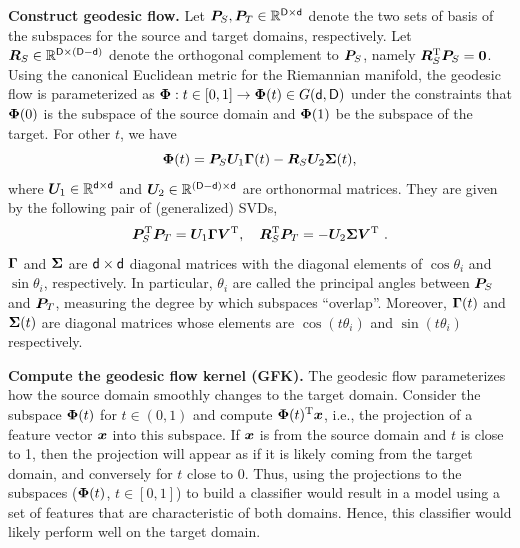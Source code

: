 {\bf Construct geodesic flow.}  Let $\boldsymbol{P}_{S}, \boldsymbol{P}_{T} \in \mathbb{R}^{\mathsf{D}\times\mathsf{d}}$ denote the two sets of basis of the subspaces for the source and target domains, respectively. Let $\boldsymbol{R}_{S} \in \mathbb{R}^{\mathsf{D}\times (\mathsf{D-d})}$ denote the orthogonal complement to $\boldsymbol{P}_{S}$, namely $\boldsymbol{R}_{S}^{\textrm T}\boldsymbol{P}_{S} = \boldsymbol{0}$. Using the canonical Euclidean metric for the Riemannian manifold, the geodesic  flow is parameterized as $\boldsymbol{\Phi}: t\in [0, 1]\rightarrow \boldsymbol{\Phi}(t) \in {G}(\mathsf{d},\mathsf{D})$ under the constraints that $\boldsymbol{\Phi}(0)$ is the subspace of the source domain and $\boldsymbol{\Phi}(1)$ be the subspace of the target.  For other $t$, we have
\begin{equation}
\mat{\Phi}(t) = \srcbase\mat{U}_1 \mat{\Gamma}(t) -  \srccomp\mat{U}_2 \mat{\Sigma}(t),
\label{eFlow}
\end{equation} %
where $\boldsymbol{U}_1 \in \mathbb{R}^{\mathsf{d}\times\mathsf{d}}$ and $\boldsymbol{U}_2 \in \mathbb{R}^{(\mathsf{D-d})\times\mathsf{d}}$  are orthonormal matrices. They are given by the following pair of (generalized) SVDs,
\begin{equation}
\srcbase\T\tgtbase = \mat{U}_1 \mat{\Gamma} \mat{V}\T,\ \ \ \srccomp\T\tgtbase = - \mat{U}_2 \mat{\Sigma}\mat{V}\T\ .
\label{eSVD}
\end{equation}
$\boldsymbol{\Gamma}$ and $\boldsymbol{\Sigma}$ are $\mathsf{d}\times\mathsf{d}$ diagonal matrices with the diagonal elements of $\cos\theta_i$ and $\sin\theta_i$, respectively.  In particular, $\theta_i$ are called the principal angles between $\boldsymbol{P}_{S}$ and $\boldsymbol{P}_{T}$, measuring
 the degree by which subspaces ``overlap''. %
Moreover, $\boldsymbol{\Gamma}(t)$ and $\boldsymbol{\Sigma}(t)$ are diagonal matrices whose elements are $\cos(t\theta_i)$ and $\sin(t\theta_i)$ respectively.

{\bf Compute the geodesic flow kernel (GFK).}  The geodesic flow parameterizes how the source domain smoothly changes to the target domain.  Consider the subspace $\boldsymbol{\Phi}(t)$ for $t\in (0,1)$ and compute $\boldsymbol{\Phi}(t)^{\textrm T}\boldsymbol{x}$, i.e., the projection of a feature vector $\boldsymbol{x}$ into this subspace. If $\boldsymbol{x}$ is from the source domain and $t$ is close to 1, then the projection  will  appear as if it is likely coming from the target domain, and conversely for $t$ close to 0. Thus, using the projections to the subspaces ($\boldsymbol{\Phi}(t)$, $t\in[0,1]$) to build a classifier  would result in a model using a set of features that are characteristic  of both domains. Hence, this classifier would likely perform well on the target domain.

